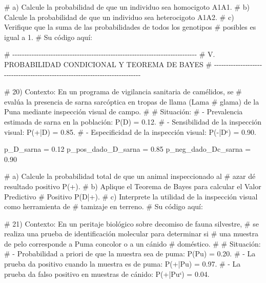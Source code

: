 \documentclass[
  spanish,
  letterpaper,
  DIV=11,
  numbers=noendperiod]{scrreprt}
\newenvironment{Shaded}{\begin{snugshade}}{\end{snugshade}}
\newcommand{\CommentTok}[1]{\textcolor[rgb]{0.37,0.37,0.37}{#1}}
\newcommand{\FloatTok}[1]{\textcolor[rgb]{0.68,0.00,0.00}{#1}}
\newcommand{\NormalTok}[1]{\textcolor[rgb]{0.00,0.23,0.31}{#1}}
\newcommand{\OtherTok}[1]{\textcolor[rgb]{0.00,0.23,0.31}{#1}}
\begin{document}
\begin{Shaded}
\begin{Highlighting}[]
\CommentTok{\#     a) Calcule la probabilidad de que un individuo sea homocigoto A1A1.}
\CommentTok{\#     b) Calcule la probabilidad de que un individuo sea heterocigoto A1A2.}
\CommentTok{\#     c) Verifique que la suma de las probabilidades de todos los genotipos}
\CommentTok{\#        posibles es igual a 1.}
\CommentTok{\# Su código aquí:}


\CommentTok{\# {-}{-}{-}{-}{-}{-}{-}{-}{-}{-}{-}{-}{-}{-}{-}{-}{-}{-}{-}{-}{-}{-}{-}{-}{-}{-}{-}{-}{-}{-}{-}{-}{-}{-}{-}{-}{-}{-}{-}{-}{-}{-}{-}{-}{-}{-}{-}{-}{-}{-}{-}{-}{-}{-}{-}{-}{-}{-}{-}{-}{-}{-}{-}{-}{-}{-}{-}{-}{-}{-}{-}{-}{-}{-}{-}{-}{-}}
\CommentTok{\# V. PROBABILIDAD CONDICIONAL Y TEOREMA DE BAYES}
\CommentTok{\# {-}{-}{-}{-}{-}{-}{-}{-}{-}{-}{-}{-}{-}{-}{-}{-}{-}{-}{-}{-}{-}{-}{-}{-}{-}{-}{-}{-}{-}{-}{-}{-}{-}{-}{-}{-}{-}{-}{-}{-}{-}{-}{-}{-}{-}{-}{-}{-}{-}{-}{-}{-}{-}{-}{-}{-}{-}{-}{-}{-}{-}{-}{-}{-}{-}{-}{-}{-}{-}{-}{-}{-}{-}{-}{-}{-}{-}}

\CommentTok{\# 20) Contexto: En un programa de vigilancia sanitaria de camélidos, se}
\CommentTok{\#     evalúa la presencia de sarna sarcóptica en tropas de llama (Lama}
\CommentTok{\#     glama) de la Puna mediante inspección visual de campo.}
\CommentTok{\#}
\CommentTok{\#     Situación:}
\CommentTok{\#     {-} Prevalencia estimada de sarna en la población: P(D) = 0.12.}
\CommentTok{\#     {-} Sensibilidad de la inspección visual: P(+|D) = 0.85.}
\CommentTok{\#     {-} Especificidad de la inspección visual: P({-}|Dᶜ) = 0.90.}

\NormalTok{p\_D\_sarna }\OtherTok{=} \FloatTok{0.12}
\NormalTok{p\_pos\_dado\_D\_sarna }\OtherTok{=} \FloatTok{0.85}
\NormalTok{p\_neg\_dado\_Dc\_sarna }\OtherTok{=} \FloatTok{0.90}

\CommentTok{\#     a) Calcule la probabilidad total de que un animal inspeccionado al}
\CommentTok{\#        azar dé resultado positivo P(+).}
\CommentTok{\#     b) Aplique el Teorema de Bayes para calcular el Valor Predictivo}
\CommentTok{\#        Positivo P(D|+).}
\CommentTok{\#     c) Interprete la utilidad de la inspección visual como herramienta de}
\CommentTok{\#        tamizaje en terreno.}
\CommentTok{\# Su código aquí:}


\CommentTok{\# 21) Contexto: En un peritaje biológico sobre decomiso de fauna silvestre,}
\CommentTok{\#     se realiza una prueba de identificación molecular para determinar si}
\CommentTok{\#     una muestra de pelo corresponde a Puma concolor o a un cánido}
\CommentTok{\#     doméstico.}
\CommentTok{\#}
\CommentTok{\#     Situación:}
\CommentTok{\#     {-} Probabilidad a priori de que la muestra sea de puma: P(Pu) = 0.20.}
\CommentTok{\#     {-} La prueba da positivo cuando la muestra es de puma: P(+|Pu) = 0.97.}
\CommentTok{\#     {-} La prueba da falso positivo en muestras de cánido: P(+|Puᶜ) = 0.04.}


\end{Highlighting}
\end{Shaded}
\end{document}
